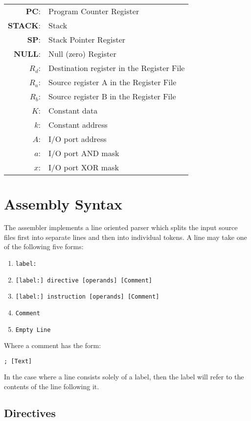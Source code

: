 \documentclass[12pt,twoside]{report}
\begin{document}
\begin{tabular}{ | r | l | }
  \hline
  \textbf{PC}: & Program Counter Register \\
  \textbf{STACK}: & Stack \\
  \textbf{SP}: & Stack Pointer Register \\
  \textbf{NULL}: & Null (zero) Register \\
  \textbf{$R_d$}: & Destination register in the Register File \\
  \textbf{$R_a$}: & Source register A in the Register File \\
  \textbf{$R_b$}: & Source register B in the Register File \\
  \textbf{$K$}: & Constant data \\
  \textbf{$k$}: & Constant address \\
  \textbf{$A$}: & I/O port address \\
  \textbf{$a$}: & I/O port AND mask \\
  \textbf{$x$}: & I/O port XOR mask \\
  \hline
\end{tabular}

\chapter{Assembly Syntax}

The assembler implements a line oriented parser which splits the input
source files first into separate lines and then into individual
tokens. A line may take one of the following five forms:

\begin{enumerate}
\item \texttt{label:}
\item \texttt{[label:] directive [operands] [Comment]}
\item \texttt{[label:] instruction [operands] [Comment]}
\item \texttt{Comment}
\item \texttt{Empty Line}
\end{enumerate}

Where a comment has the form:

\begin{verbatim}
; [Text]
\end{verbatim}

In the case where a line consists solely of a label, then the label
will refer to the contents of the line following it.

\section{Directives}
\end{document}
